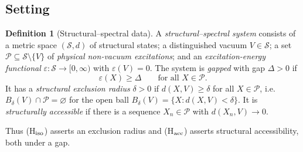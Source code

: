 \documentclass[11pt,a4paper]{article}
\theoremstyle{definition}
\newtheorem{definition}{Definition}
\theoremstyle{remark}
\newcommand{\Pset}{\mathcal{P}}
\begin{document}
\subsection{Setting}
\begin{definition}[Structural--spectral data]
A \emph{structural--spectral system} consists of a metric space $(\mathcal S,d)$ of structural states; a distinguished vacuum $V\in\mathcal S$; a set $\Pset\subseteq\mathcal S\setminus\{V\}$ of \emph{physical non-vacuum excitations}; and an \emph{excitation-energy functional} $\varepsilon:\mathcal S\to[0,\infty)$ with $\varepsilon(V)=0$. The system is \emph{gapped} with gap $\Delta>0$ if
\begin{equation}\label{eq:gap}
\varepsilon(X)\ge\Delta\qquad\text{for all }X\in\Pset .
\end{equation}
It has a \emph{structural exclusion radius} $\delta>0$ if $d(X,V)\ge\delta$ for all $X\in\Pset$, i.e.\ $B_\delta(V)\cap\Pset=\varnothing$ for the open ball $B_\delta(V)=\{X:d(X,V)<\delta\}$. It is \emph{structurally accessible} if there is a sequence $X_n\in\Pset$ with $d(X_n,V)\to0$.
\end{definition}
Thus (H$_{\rm iso}$) asserts an exclusion radius and (H$_{\rm acc}$) asserts structural accessibility, both under a gap.
\end{document}
